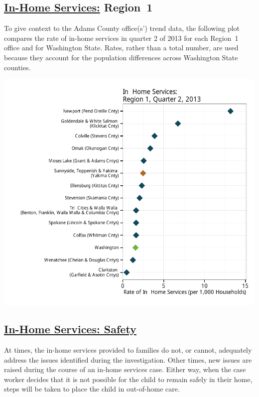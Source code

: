 \documentclass{article}\usepackage[]{graphicx}\usepackage[]{color}
\makeatletter
\def\maxwidth{ %
  \ifdim\Gin@nat@width>\linewidth
    \linewidth
  \else
    \Gin@nat@width
  \fi
}
\newenvironment{knitrout}{}{} %
\makeatother
\begin{document}
\subsection{\href{http://www.partnersforourchildren.org/child-well-being/visualizations/home-services/trends}
    {In-Home Services:} Region~1
}
To give context to the Adams County office(s') trend data, the following plot compares the rate of in-home services in quarter 2 of 2013 for each Region~1 office and for Washington State. Rates, rather than a total number, are used because they account for the population differences across Washington State counties.
\nopagebreak[3]
\begin{knitrout}
\color{fgcolor}

{\centering \includegraphics[width=\maxwidth]{figure/ihs_context} 

}



\end{knitrout}


\newpage

\subsection{\href{http://www.partnersforourchildren.org/child-well-being/visualizations/home-services/safety}
    {In-Home Services: Safety}
}
At times, the in-home services provided to families do not, or cannot, adequately address the issues identified during the investigation. Other times, new issues are raised during the course of an in-home services case. Either way, when the case worker decides that it is not possible for the child to remain safely in their home, steps will be taken to place the child in out-of-home care.
\end{document}
